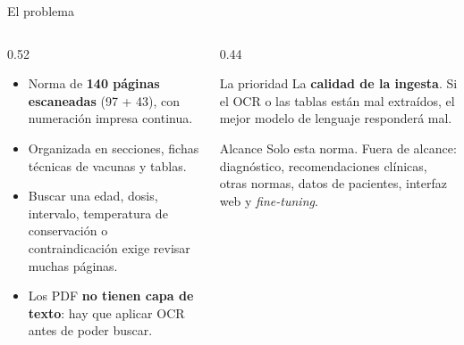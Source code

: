 \documentclass[aspectratio=169,11pt]{beamer}
\begin{document}
\begin{frame}{El problema}
  \begin{columns}[T]
    \begin{column}{0.52\textwidth}
      \begin{itemize}
        \item Norma de \textbf{140 páginas escaneadas} (97 + 43), con numeración
              impresa continua.
        \item Organizada en secciones, fichas técnicas de vacunas y tablas.
        \item Buscar una edad, dosis, intervalo, temperatura de conservación o
              contraindicación exige revisar muchas páginas.
        \item Los PDF \textbf{no tienen capa de texto}: hay que aplicar OCR antes
              de poder buscar.
      \end{itemize}
    \end{column}
    \begin{column}{0.44\textwidth}
      \begin{block}{La prioridad}
        La \textbf{calidad de la ingesta}. Si el OCR o las tablas están mal
        extraídos, el mejor modelo de lenguaje responderá mal.
      \end{block}
      \vspace{1mm}
      \begin{block}{Alcance}
        Solo esta norma. Fuera de alcance: diagnóstico, recomendaciones clínicas,
        otras normas, datos de pacientes, interfaz web y \emph{fine-tuning}.
      \end{block}
    \end{column}
  \end{columns}
\end{frame}
\end{document}
